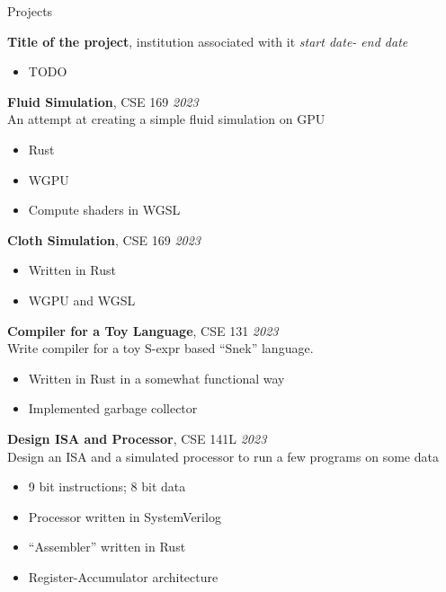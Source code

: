 	\begin{rSection}{Projects}

		{\bf Title of the project}{, institution associated with it} \hfill {\em start date- end date}
		\begin{multicols}{2}
			\begin{itemize}
				\item TODO
			\end{itemize}
		\end{multicols}

		{\bf Fluid Simulation}{, CSE 169} \hfill {\em 2023} \\
		An attempt at creating a simple fluid simulation on GPU
		\begin{multicols}{2}
			\begin{itemize}
				\item Rust
				\item WGPU
				\item Compute shaders in WGSL
			\end{itemize}
		\end{multicols}

		{\bf Cloth Simulation}{, CSE 169} \hfill {\em 2023}
		\begin{multicols}{2}
			\begin{itemize}
				\item Written in Rust
				\item WGPU and WGSL
			\end{itemize}
		\end{multicols}

		{\bf Compiler for a Toy Language}{, CSE 131} \hfill {\em 2023} \\
		Write compiler for a toy S-expr based ``Snek'' language.
		\begin{multicols}{2}
			\begin{itemize}
				\item Written in Rust in a somewhat functional way
				\item Implemented garbage collector
			\end{itemize}
		\end{multicols}

		{\bf Design ISA and Processor}{, CSE 141L} \hfill {\em 2023} \\
		Design an ISA and a simulated processor to run a few programs on some data
		\begin{multicols}{2}
			\begin{itemize}
				\item 9 bit instructions; 8 bit data
				\item Processor written in SystemVerilog
				\item ``Assembler'' written in Rust
				\item Register-Accumulator architecture
			\end{itemize}
		\end{multicols}


\end{rSection}
